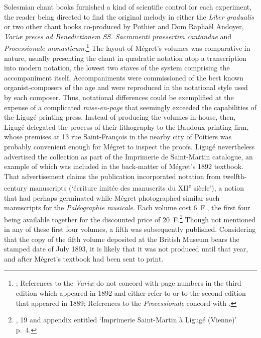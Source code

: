 Solesmian chant books furnished a kind of scientific control for each experiment, the reader being directed to find the original melody in either the \emph{Liber gradualis} or two other chant books co-produced by Pothier and Dom Raphaël Andoyer, \emph{Variæ preces ad Benedictionem SS. Sacramenti praesertim cantandae} and \emph{Processionale monasticum}.\footnote{\cites[142]{CombeHistoirerestaurationchant1969}[122]{CombeRestorationGregorianChant2003}; References to the \emph{Variæ} do not concord with page numbers in the third edition which appeared in 1892 and either refer to \covid{}\cite{Variaeprecesad1888} or to the second edition that appeared in 1889; References to the \emph{Processionale} concord with \cite{Processionalemonasticum1888}.}
The layout of Mégret's volumes was comparative in nature, usually presenting the chant in quadratic notation atop a transcription into modern notation, the lowest two staves of the system comprising the accompaniment itself.
Accompaniments were commissioned of the best known organist-composers of the age and were reproduced in the notational style used by each composer.
Thus, notational differences could be exemplified at the expense of a complicated \emph{mise-en-page} that seemingly exceeded the capabilities of the Ligugé printing press.
Instead of producing the volumes in-house, then, Ligugé delegated the process of their lithography to the Baudoux printing firm, whose premises at 13 rue Saint-François in the nearby city of Poitiers was probably convenient enough for Mégret to inspect the proofs.
Ligugé nevertheless advertised the collection as part of the Imprimerie de Saint-Martin catalogue, an example of which was included in the back-matter of Mégret's 1892 textbook.
That advertisement claims the publication incorporated notation from twelfth-century manuscripts (`écriture imitée des manuscrits du XII\textsuperscript{e} siècle'), a notion that had perhaps germinated while Mégret photographed similar such manuscripts for the \emph{Paléographie musicale}.
Each volume cost 6~F., the first four being available together for the discounted price of 20~F.\footnote{\cite{Megretchantliturgiquedans1892}, 19 and appendix entitled `Imprimerie Saint-Martin à Ligugé (Vienne)' p.~4.}
Though not mentioned in any of these first four volumes, a fifth was subsequently published.
Considering that the copy of the fifth volume deposited at the British Museum bears the stamped date of July 1893, it is likely that it was not produced until that year, and after Mégret's textbook had been sent to print.

